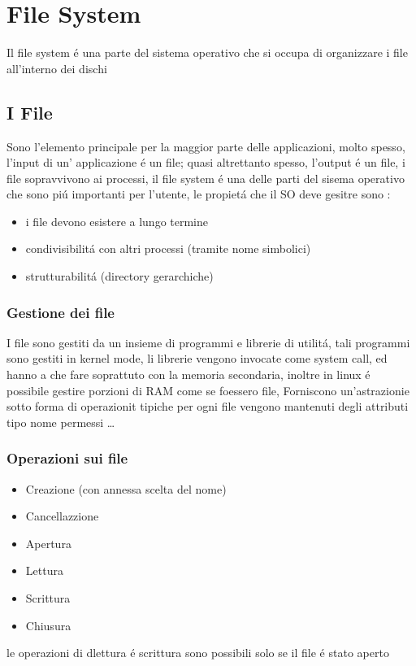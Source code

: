 \section{File System}
Il file system é una parte del sistema operativo che si occupa di organizzare i file all'interno dei dischi

\subsection{I File}
Sono l'elemento principale per la maggior parte delle applicazioni, molto spesso, l'input di un' applicazione é un file;
quasi altrettanto spesso, l'output é un file, i file sopravvivono ai processi, il file system é una delle parti del sisema operativo che
sono piú importanti per l'utente, le propietá che il SO deve gesitre sono :
\begin{itemize}
    \item i file devono esistere a lungo termine
    \item condivisibilitá con altri processi (tramite nome simbolici)
    \item strutturabilitá (directory gerarchiche)
\end{itemize}
\subsubsection*{Gestione dei file}
I file sono gestiti da un insieme di programmi e librerie di utilitá, tali programmi sono gestiti in kernel mode, li
librerie vengono invocate come system call, ed hanno a che fare soprattuto con la memoria secondaria, inoltre
in linux é possibile gestire porzioni di RAM come se foessero file, Forniscono un'astrazionie sotto forma di operazionit tipiche
per ogni file vengono mantenuti degli attributi tipo nome permessi \ldots
\subsubsection*{Operazioni sui file}
\begin{itemize}
    \item Creazione (con annessa scelta del nome)
    \item Cancellazzione
    \item Apertura
    \item Lettura
    \item Scrittura
    \item Chiusura
\end{itemize}
le operazioni di dlettura é scrittura sono possibili solo se il file é stato aperto
